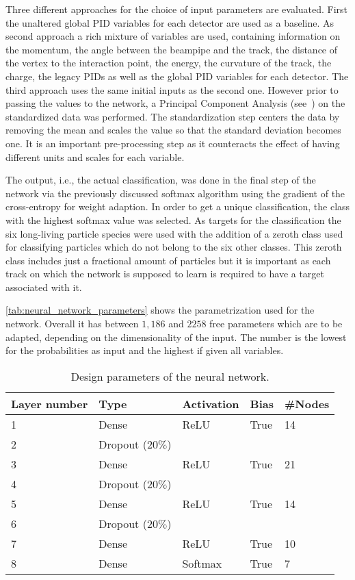 Three different approaches for the choice of input parameters are evaluated. First the unaltered global PID variables for each detector are used as a baseline. As second approach a rich mixture of variables are used, containing information on the momentum, the angle between the beampipe and the track, the distance of the vertex to the interaction point, the energy, the curvature of the track, the charge, the legacy PIDs as well as the global PID variables for each detector. The third approach uses the same initial inputs as the second one. However prior to passing the values to the network, a Principal Component Analysis (see~\cite{BigDataManagementAndAnalytics:TextProcessingAndHigh-DimensionalData}) on the standardized data was performed. The standardization step centers the data by removing the mean and scales the value so that the standard deviation becomes one. It is an important pre-processing step as it counteracts the effect of having different units and scales for each variable.

The output, i.e., the actual classification, was done in the final step of the network via the previously discussed softmax algorithm using the gradient of the cross-entropy for weight adaption. In order to get a unique classification, the class with the highest softmax value was selected. As targets for the classification the six long-living particle species were used with the addition of a zeroth class used for classifying particles which do not belong to the six other classes. This zeroth class includes just a fractional amount of particles but it is important as each track on which the network is supposed to learn is required to have a target associated with it.

\autoref{tab:neural_network_parameters} shows the parametrization used for the network. Overall it has between $1,186$ and $2258$ free parameters which are to be adapted, depending on the dimensionality of the input. The number is the lowest for the probabilities as input and the highest if given all variables.

\begin{table}[ht]
	\centering
	\begin{tabular}{l|llll}
		Layer number & Type & Activation & Bias & \#Nodes  \\
		\hline
		1 & Dense & ReLU & True & 14 \\
		2 & Dropout ($20\%$) \\
		3 & Dense & ReLU & True & 21 \\
		4 & Dropout ($20\%$) \\
		5 & Dense & ReLU & True & 14 \\
		6 & Dropout ($20\%$) \\
		7 & Dense & ReLU & True & 10 \\
		8 & Dense & Softmax & True & 7
	\end{tabular}
	\caption{Design parameters of the neural network.}
	\label{tab:neural_network_parameters}
\end{table}


